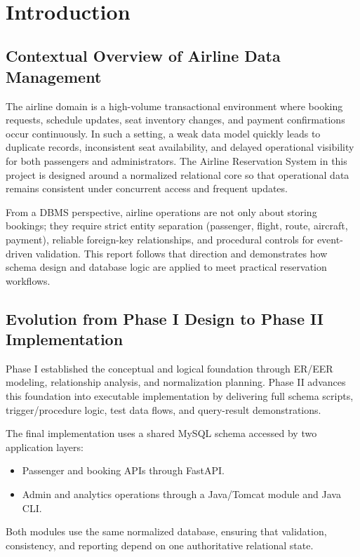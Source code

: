 \documentclass[12pt, a4paper]{article}
\begin{document}
\begin{titlepage}
    \vspace{2cm}
    {}\\
    {}
\end{titlepage}

\tableofcontents
\newpage



\section{Introduction}

\subsection{Contextual Overview of Airline Data Management}
The airline domain is a high-volume transactional environment where booking requests, schedule updates, seat inventory changes, and payment confirmations occur continuously. In such a setting, a weak data model quickly leads to duplicate records, inconsistent seat availability, and delayed operational visibility for both passengers and administrators. The Airline Reservation System in this project is designed around a normalized relational core so that operational data remains consistent under concurrent access and frequent updates.

From a DBMS perspective, airline operations are not only about storing bookings; they require strict entity separation (passenger, flight, route, aircraft, payment), reliable foreign-key relationships, and procedural controls for event-driven validation. This report follows that direction and demonstrates how schema design and database logic are applied to meet practical reservation workflows.

\subsection{Evolution from Phase I Design to Phase II Implementation}
Phase I established the conceptual and logical foundation through ER/EER modeling, relationship analysis, and normalization planning. Phase II advances this foundation into executable implementation by delivering full schema scripts, trigger/procedure logic, test data flows, and query-result demonstrations.

The final implementation uses a shared MySQL schema accessed by two application layers:
\begin{itemize}
    \item Passenger and booking APIs through FastAPI.
    \item Admin and analytics operations through a Java/Tomcat module and Java CLI.
\end{itemize}
Both modules use the same normalized database, ensuring that validation, consistency, and reporting depend on one authoritative relational state.
\end{document}

